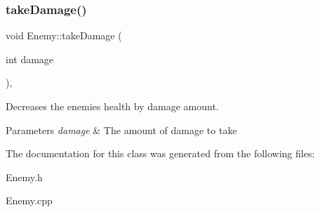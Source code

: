 \subsubsection{\texorpdfstring{takeDamage()}{takeDamage()}}
{\footnotesize\ttfamily void Enemy\+::take\+Damage (\begin{DoxyParamCaption}\item[{int}]{damage }\end{DoxyParamCaption})\hspace{0.3cm}{\ttfamily [protected]}, {\ttfamily [virtual]}}



Decreases the enemies health by damage amount. 


\begin{DoxyParams}{Parameters}
{\em damage} & The amount of damage to take \\
\hline
\end{DoxyParams}


The documentation for this class was generated from the following files\+:\begin{DoxyCompactItemize}
\item 
Enemy.\+h\item 
Enemy.\+cpp\end{DoxyCompactItemize}
